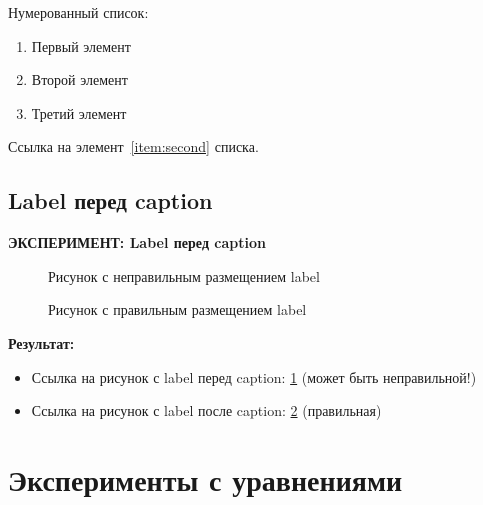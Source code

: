\documentclass[12pt]{article}
\begin{document}
Нумерованный список:
\begin{enumerate}
    \item Первый элемент \label{item:first}
    \item Второй элемент \label{item:second}
    \item Третий элемент \label{item:third}
\end{enumerate}

Ссылка на элемент~\ref{item:second} списка.

\lipsum[14]

\subsection{Label перед caption}
\label{subsec:wronglabel}

\textbf{ЭКСПЕРИМЕНТ: Label перед caption}

\begin{figure}[htbp]
    \centering
    \label{fig:wronglabel} %
    \caption{Рисунок с неправильным размещением label}
\end{figure}

\begin{figure}[htbp]
    \centering
    \caption{Рисунок с правильным размещением label}
    \label{fig:correctlabel} %
\end{figure}

\textbf{Результат:}
\begin{itemize}
    \item Ссылка на рисунок с label перед caption: \ref{fig:wronglabel} (может быть неправильной!)
    \item Ссылка на рисунок с label после caption: \ref{fig:correctlabel} (правильная)
\end{itemize}

\lipsum[15]

\section{Эксперименты с уравнениями}
\label{sec:equations}
\end{document}
